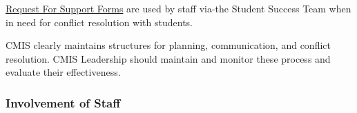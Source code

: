 \begin{findings}
\href{https://docs.google.com/a/cmis.ac.th/forms/d/e/1FAIpQLScVtFtaEXarGOjwsiJyGdbLAMbeNzG9m44i1fWXFLbtMKZcUg/viewform}{Request For Support Forms} are used by staff via-the Student Success Team when in need for conflict resolution with students.


CMIS clearly maintains structures for planning, communication, and conflict resolution. CMIS Leadership should maintain and monitor these process and evaluate their effectiveness. 

\end{findings}

\subsubsection{Involvement of Staff}



